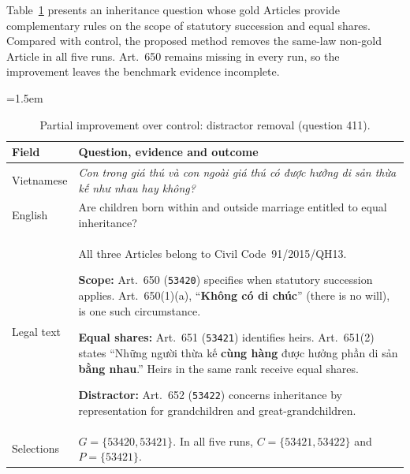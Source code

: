 \begin{table}[H]
\noindent\normalsize Table~\ref{tab:case411} presents an inheritance question whose gold Articles provide complementary rules on the scope of statutory succession and equal shares. Compared with control, the proposed method removes the same-law non-gold Article in all five runs. Art.~650 remains missing in every run, so the improvement leaves the benchmark evidence incomplete.
\par\vspace{5pt}
\centering\small
\emergencystretch=1.5em
\setlength{\tabcolsep}{4pt}
\renewcommand{\arraystretch}{1.08}
\caption{Partial improvement over control: distractor removal (question 411).}
\label{tab:case411}
\begin{tabularx}{\linewidth}{>{\columncolor{tableband}\raggedright\arraybackslash}p{1.8cm}>{\raggedright\arraybackslash}X}
\hline
\textbf{Field} & \textbf{Question, evidence and outcome}\\\hline
Vietnamese & \emph{Con trong giá thú và con ngoài giá thú có được hưởng di sản thừa kế như nhau hay không?}\\\hline
English & Are children born within and outside marriage entitled to equal inheritance?\\\hline
Legal text & All three Articles belong to Civil Code~91/2015/QH13.
\par\smallskip
\textbf{Scope:} Art.~650 (\texttt{53420}) specifies when statutory succession applies. Art.~650(1)(a), ``\textbf{Không có di chúc}'' (there is no will), is one such circumstance.
\par\smallskip
\textbf{Equal shares:} Art.~651 (\texttt{53421}) identifies heirs. Art.~651(2) states ``Những người thừa kế \textbf{cùng hàng} được hưởng phần di sản \textbf{bằng nhau}.'' Heirs in the same rank receive equal shares.
\par\smallskip
\textbf{Distractor:} Art.~652 (\texttt{53422}) concerns inheritance by representation for grandchildren and great-grandchildren.\\\hline
Selections & $G=\{53420,53421\}$. In all five runs, $C=\{53421,53422\}$ and $P=\{53421\}$.\\
\hline
\end{tabularx}
\end{table}
\endgroup
\newpage

